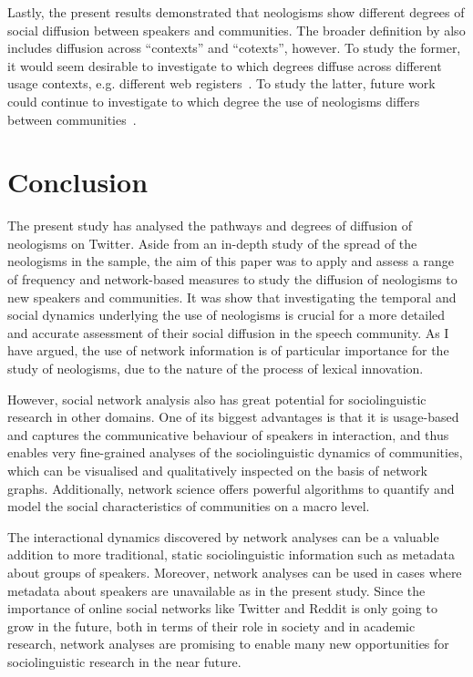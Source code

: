 \documentclass[
  a4paper,
  abstract=on,
  captions=tableabove
  ]{scrartcl}
\begin{document}
    Lastly, the present results demonstrated that neologisms show different degrees of social diffusion between speakers and communities. The broader definition by \cite{Schmid2020DynamicsLinguistic} also includes diffusion across \enquote{contexts} and \enquote{cotexts}, however. To study the former, it would seem desirable to investigate to which degrees diffuse across different usage contexts, e.g. different web registers~\parencite{Biber2016RegisterVariation}. To study the latter, future work could continue to investigate to which degree the use of neologisms differs between communities~\parencite{Tredici2019YouShall,Schmid2020BattlingSemantica}.


\section{Conclusion}
  \label{sec:conclusion}

  The present study has analysed the pathways and degrees of diffusion of neologisms on Twitter. Aside from an in-depth study of the spread of the neologisms in the sample, the aim of this paper was to apply and assess a range of frequency and network-based measures to study the diffusion of neologisms to new speakers and communities. It was show that investigating the temporal and social dynamics underlying the use of neologisms is crucial for a more detailed and accurate assessment of their social diffusion in the speech community. As I have argued, the use of network information is of particular importance for the study of neologisms, due to the nature of the process of lexical innovation.

    However, social network analysis also has great potential for sociolinguistic research in other domains. One of its biggest advantages is that it is usage-based and captures the communicative behaviour of speakers in interaction, and thus enables very fine-grained analyses of the sociolinguistic dynamics of communities, which can be visualised and qualitatively inspected on the basis of network graphs. Additionally, network science offers powerful algorithms to quantify and model the social characteristics of communities on a macro level.

    The interactional dynamics discovered by network analyses can be a valuable addition to more traditional, static sociolinguistic information such as metadata about groups of speakers. Moreover, network analyses can be used in cases where metadata about speakers are unavailable as in the present study. Since the importance of online social networks like Twitter and Reddit is only going to grow in the future, both in terms of their role in society and in academic research, network analyses are promising to enable many new opportunities for sociolinguistic research in the near future. 
\end{document}
